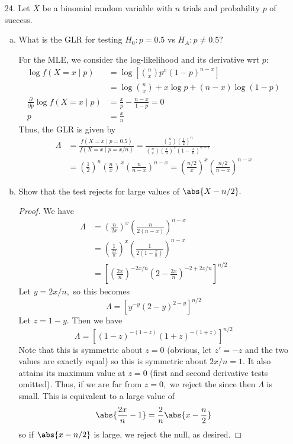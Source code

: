 \documentclass{article}
\begin{document}
\begin{itemize}
	\item[24.] Let $X$ be a binomial random variable with $n$ trials and probability $p$ of success.
		\begin{enumerate}[a.]
			\item What is the GLR for testing $H_0:p=0.5$ vs $H_A:p\neq 0.5?$
				\begin{soln}
					For the MLE, we consider the log-likelihood and its derivative wrt $p:$
					\begin{align*}
						\log f(X=x\mid p) &= \log\left[ \binom{n}{x} p^{x}(1-p)^{n-x} \right] \\
						&= \log \binom{n}{x} + x\log p + (n-x)\log (1-p) \\
						\frac{\partial}{\partial p} \log f(X=x\mid p) &= \frac{x}{p}-\frac{n-x}{1-p} = 0 \\
						p &= \frac{x}{n}
					\end{align*}
					Thus, the GLR is given by
					\begin{align*}
						\Lambda &= \frac{f(X=x\mid p=0.5)}{f(X=x\mid p=x/n)} = \frac{\binom{n}{x}\left( \frac{1}{2} \right)^n}{\binom{n}{x} \left( \frac{x}{n} \right)^x\left( 1-\frac{x}{n} \right)^{n-x}} \\
						&= \left( \frac{1}{2} \right)^n \left( \frac{n}{x} \right)^x \left( \frac{n}{n-x} \right)^{n-x} = \left( \frac{n/2}{x} \right)^x \left( \frac{n/2}{n-x} \right)^{n-x}
					\end{align*}
				\end{soln}

			\item Show that the test rejects for large values of $\abs{X-n/2}.$
				\begin{proof}
					We have
					\begin{align*}
						\Lambda &= \left( \frac{n}{2x} \right)^x \left(\frac{n}{2(n-x)}\right)^{n-x} \\
						&= \left( \frac{1}{\frac{2x}{n}} \right)^x \left( \frac{1}{2\left( 1-\frac{x}{n} \right)} \right)^{n-x} \\
						&=\left[ \left( \frac{2x}{n} \right)^{-2x/n}\left(2-\frac{2x}{n}  \right)^{-2+2x/n} \right]^{n/2} 
					\end{align*}
					Let $y=2x/n,$ so this becomes \[\Lambda = \left[y^{-y} \left( 2-y \right)^{2-y}\right]^{n/2}\] Let $z = 1-y.$ Then we have \[\Lambda = \left[ (1-z)^{-(1-z)}(1+z)^{-(1+z)} \right]^{n/2}\] Note that this is symmetric about $z=0$ (obvious, let $z'=-z$ and the two values are exactly equal) so this is symmetric about $2x/n=1.$ It also attains its maximum value at $z=0$ (first and second derivative tests omitted). Thus, if we are far from $z=0,$ we reject the since then $\Lambda$ is small. This is equivalent to a large value of \[\abs{\frac{2x}{n}-1}=\frac{2}{n}\abs{x-\frac{n}{2}}\] so if $\abs{x-n/2}$ is large, we reject the null, as desired.


\end{proof}
\end{enumerate}
\end{itemize}
\end{document}
